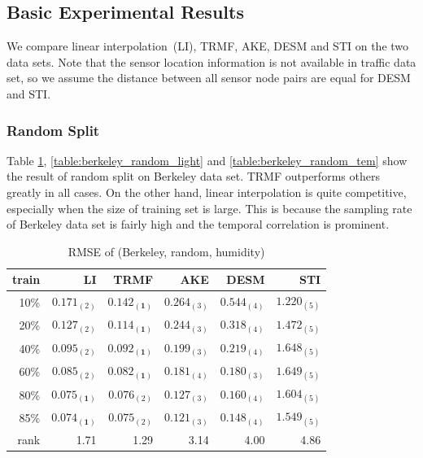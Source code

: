 \subsection{Basic Experimental Results} %
We compare linear interpolation~(LI), TRMF, AKE, DESM and STI on the two data sets. Note that the sensor location information is not available in traffic data set, so we assume the distance between all sensor node pairs are equal for DESM and STI.

\subsubsection{Random Split}
Table \ref{table:berkeley_random_hum}, \ref{table:berkeley_random_light} and \ref{table:berkeley_random_tem} show the result of random split on Berkeley data set. TRMF outperforms others greatly in all cases. On the other hand, linear interpolation is quite competitive, especially when the size of training set is large. This is because the sampling rate of Berkeley data set is fairly high and the temporal correlation is prominent. 

\begin{table}[htbp]
\centering
\caption{RMSE of (Berkeley, random, humidity)}
\label{table:berkeley_random_hum}
\begin{tabular}{ r | r r r r r}
	train	&LI	&TRMF	&AKE	&DESM	&STI\\ \hline
	10\% & $ 0.171_{(2)} $ & $ \mathbf{ 0.142_{(1)} } $ & $ 0.264_{(3)} $ & $ 0.544_{(4)} $ & $ 1.220_{(5)} $ \\
	20\% & $ 0.127_{(2)} $ & $ \mathbf{ 0.114_{(1)} } $ & $ 0.244_{(3)} $ & $ 0.318_{(4)} $ & $ 1.472_{(5)} $ \\
	40\% & $ 0.095_{(2)} $ & $ \mathbf{ 0.092_{(1)} } $ & $ 0.199_{(3)} $ & $ 0.219_{(4)} $ & $ 1.648_{(5)} $ \\
	60\% & $ 0.085_{(2)} $ & $ \mathbf{ 0.082_{(1)} } $ & $ 0.181_{(4)} $ & $ 0.180_{(3)} $ & $ 1.649_{(5)} $ \\
	80\% & $ \mathbf{ 0.075_{(1)} } $ & $ 0.076_{(2)} $ & $ 0.127_{(3)} $ & $ 0.160_{(4)} $ & $ 1.604_{(5)} $ \\
	85\% & $ \mathbf{ 0.074_{(1)} } $ & $ 0.075_{(2)} $ & $ 0.121_{(3)} $ & $ 0.148_{(4)} $ & $ 1.549_{(5)} $ \\ \hline
	rank &1.71 &1.29 &3.14 &4.00 &4.86 \\
\end{tabular}
\end{table}

